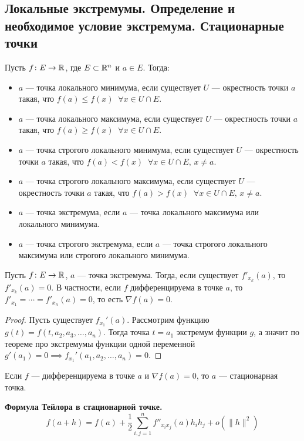 \subsection{Локальные экстремумы. Определение и необходимое условие экстремума. Стационарные точки}
\begin{conj}
Пусть $f\colon E \to \mathbb{R}$, где $E \subset \mathbb{R}^n$ и $a \in E$. Тогда:
\begin{itemize}
    \item $a$ --- точка локального минимума, если существует $U$ --- окрестность точки $a$ такая, что $f(a) \leqslant f(x) \;\; \forall x \in U \cap E$.
    \item $a$ --- точка локального максимума, если существует $U$ --- окрестность точки $a$ такая, что $f(a) \geqslant f(x) \;\; \forall x \in U \cap E$.
    \item $a$ --- точка строгого локального минимума, если существует $U$ --- окрестность точки $a$ такая, что $f(a) < f(x) \;\; \forall x \in U \cap E,\, x \neq a$.
    \item $a$ --- точка строгого локального максимума, если существует $U$ --- окрестность точки $a$ такая, что $f(a) > f(x) \;\; \forall x \in U \cap E,\, x \neq a$.
    \item $a$ --- точка экстремума, если $a$ --- точка локального максимума или локального минимума.
    \item $a$ --- точка строгого экстремума, если $a$ --- точка строгого локального максимума или строгого локального минимума.
\end{itemize}
\end{conj}

\begin{theorem}
Пусть $f\colon E \to \mathbb{R}$, $a$ --- точка экстремума. Тогда, если существует $f'_{x_k}(a)$, то $f'_{x_k}(a) = 0$. В частности, если $f$ дифференцируема в точке $a$, то $f'_{x_1} = \dotsb = f'_{x_n}(a) = 0$, то есть $\nabla  f(a) = 0$.
\end{theorem}
\begin{proof}
Пусть существует $f_{x_1}'(a)$. Рассмотрим функцию $g(t) = f(t, a_2, a_3, \dotsc, a_n)$. Тогда точка $t = a_1$ экстремум функции $g$, а значит по теореме про экстремумы функции одной переменной $g'(a_1) = 0 \implies f_{x_1}'(a_1, a_2, \dotsc, a_n) = 0$.
\end{proof}

\begin{conj}
Если $f$ --- дифференцируема в точке $a$ и $\nabla f(a) = 0$, то $a$ --- стационарная точка.
\end{conj}

\textbf{Формула Тейлора в стационарной точке.}
\begin{equation*}
f(a + h) = f(a) + \frac{1}{2} \sum\limits_{i, j = 1}^{n} f''_{x_i x_j}(a) h_i h_j + o(\| h \|^2)
\end{equation*}